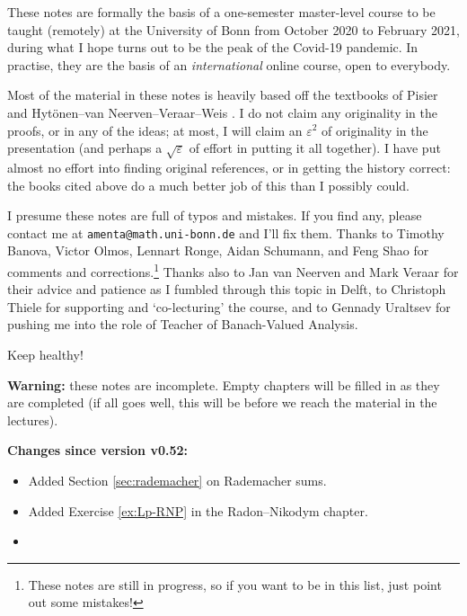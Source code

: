 These notes are formally the basis of a one-semester master-level course to be taught (remotely) at the University of Bonn from October 2020 to February 2021, during what I hope turns out to be the peak of the Covid-19 pandemic.
In practise, they are the basis of an \emph{international} online course, open to everybody.

Most of the material in these notes is heavily based off the textbooks of Pisier \cite{gP16} and Hyt\"onen--van Neerven--Veraar--Weis \cite{HNVW16, HNVW17}.
I do not claim any originality in the proofs, or in any of the ideas; at most, I will claim an $\varepsilon^2$ of originality in the presentation (and perhaps a $\sqrt{\varepsilon}$ of effort in putting it all together).
I have put almost no effort into finding original references, or in getting the history correct: the books cited above do a much better job of this than I possibly could.

\vspace{1cm}

I presume these notes are full of typos and mistakes.
If you find any, please contact me at \texttt{amenta@math.uni-bonn.de} and I'll fix them.
Thanks to Timothy Banova, Victor Olmos, Lennart Ronge, Aidan Schumann, and Feng Shao for comments and corrections.\footnote{These notes are still in progress, so if you want to be in this list, just point out some mistakes!}
Thanks also to Jan van Neerven and Mark Veraar for their advice and patience as I fumbled through this topic in Delft, to Christoph Thiele for supporting and `co-lecturing' the course, and to Gennady Uraltsev for pushing me into the role of Teacher of Banach-Valued Analysis.

\vspace{1cm}

Keep healthy! 




\vspace{2cm}

\textbf{Warning:} these notes are incomplete.
Empty chapters will be filled in as they are completed (if all goes well, this will be before we reach the material in the lectures).

\textbf{Changes since version v0.52:}
\begin{itemize}
\item Added Section \ref{sec:rademacher} on Rademacher sums.
\item Added Exercise \ref{ex:Lp-RNP} in the Radon--Nikodym chapter.
\item 

  
\end{itemize}





